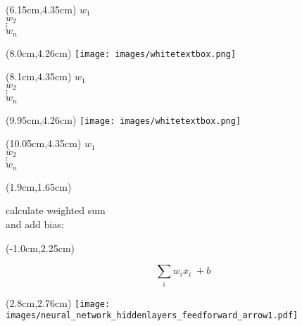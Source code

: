 \documentclass{beamer}
\begin{document}
{\begin{textblock*}{2.7cm}(6.15cm,4.35cm) %
$w_1$\\  
$w_2$\\ 
$\vdots$\\ 
$w_n$
\end{textblock*}


%
%
\begin{textblock*}{0.65cm}(8.0cm,4.26cm) %
\texttt{[image: images/whitetextbox.png]}
\end{textblock*}

\begin{textblock*}{2.7cm}(8.1cm,4.35cm) %
$w_1$\\  
$w_2$\\ 
$\vdots$\\ 
$w_n$
\end{textblock*}

%
%
\begin{textblock*}{0.65cm}(9.95cm,4.26cm) %
\texttt{[image: images/whitetextbox.png]}
\end{textblock*}

\begin{textblock*}{2.7cm}(10.05cm,4.35cm) %
$w_1$\\  
$w_2$\\ 
$\vdots$\\ 
$w_n$
\end{textblock*}




\begin{textblock*}{7.7cm}(1.9cm,1.65cm) %
\begin{footnotesize}
calculate weighted sum \\ \vspace{-0.15cm} and add bias:
\end{footnotesize}
\end{textblock*}


\begin{textblock*}{7.7cm}(-1.0cm,2.25cm) %
\begin{footnotesize}
\begin{equation*}
\sum_i w_i x_i  \; + b
\end{equation*}
\end{footnotesize}
\end{textblock*}

\begin{textblock*}{1.86cm}(2.8cm,2.76cm) %
\texttt{[image: images/neural\_network\_hiddenlayers\_feedforward\_arrow1.pdf]}
\end{textblock*}

}
\end{document}
